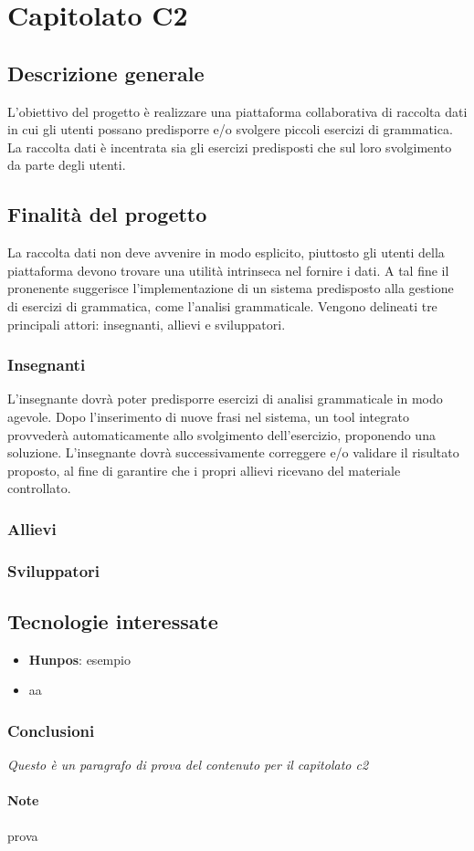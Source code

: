 \section{Capitolato C2}
\subsection{Descrizione generale}
L’obiettivo del progetto è realizzare una piattaforma collaborativa di raccolta dati in cui gli utenti possano predisporre
e/o svolgere piccoli esercizi di grammatica. La raccolta dati è incentrata sia gli esercizi predisposti che sul loro svolgimento da parte degli utenti.

\subsection{Finalità del progetto}
La raccolta dati non deve avvenire in
modo esplicito, piuttosto gli utenti della piattaforma devono trovare una utilità intrinseca nel fornire i dati. A tal fine il pronenente suggerisce l'implementazione di un sistema predisposto alla gestione di esercizi di grammatica, come l'analisi grammaticale. Vengono delineati tre principali attori: insegnanti, allievi e sviluppatori.
\subsubsection{Insegnanti}
L’insegnante dovrà poter predisporre esercizi di analisi grammaticale in modo agevole. Dopo l'inserimento di nuove frasi nel sistema, un tool integrato provvederà automaticamente allo svolgimento dell'esercizio, proponendo una soluzione. L'insegnante dovrà successivamente correggere e/o validare il risultato proposto, al fine di garantire che i propri allievi ricevano del materiale controllato.
\subsubsection{Allievi}
\subsubsection{Sviluppatori}

\subsection{Tecnologie interessate}
\begin{itemize}
	\item \textbf{Hunpos}: esempio
	\item aa
\end{itemize}
\subsubsection{Conclusioni}
\textit{Questo è un paragrafo di prova del contenuto per il capitolato c2}
\paragraph{Note}
prova